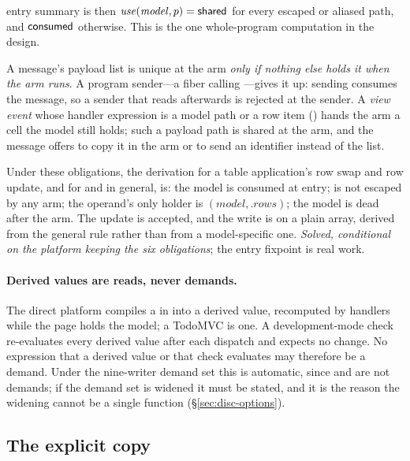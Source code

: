 \begin{description}[leftmargin=1.2em,font=\normalfont\itshape]
entry summary is then $\mathit{use}(\mathit{model}, p) = \mathsf{shared}$ for every escaped or aliased path,
and $\mathsf{consumed}$ otherwise. This is the one whole-program computation in the design.
\item[Payloads.] A message's payload list is unique at the arm \emph{only if nothing else holds it when
the arm runs}. A program sender---a fiber calling ---gives it up: sending consumes
the message, so a sender that reads  afterwards is rejected at the sender. A \emph{view
event} whose handler expression is a model path or a row item ()
hands the arm a cell the model still holds; such a payload path is shared at the arm, and the message
offers to copy it in the arm or to send an identifier instead of the list.
\end{description}

Under these obligations, the derivation for a table application's row swap and row update, and for
 and  in general, is: the model is consumed
at entry;  is not escaped by any arm; the operand's only holder is
$(\mathit{model}, .\mathit{rows})$; the model is dead after the arm. The update is accepted, and the
write is  on a plain array, derived from the general rule rather than from a
model-specific one. \emph{Solved, conditional on the platform keeping the six obligations}; the entry
fixpoint is real work.

\paragraph{Derived values are reads, never demands.} The direct platform compiles a  in
 into a derived value, recomputed by handlers while the page holds the model; a TodoMVC
 is one. A development-mode check
re-evaluates every derived value after each dispatch and expects no change. No expression that a
derived value or that check evaluates may therefore be a demand. Under the nine-writer demand set this
is automatic, since  and  are not demands; if the demand set is widened it must be
stated, and it is the reason the widening cannot be a single function (\S\ref{sec:disc-options}).

\subsection{The explicit copy}
\label{sec:hard-copy}


